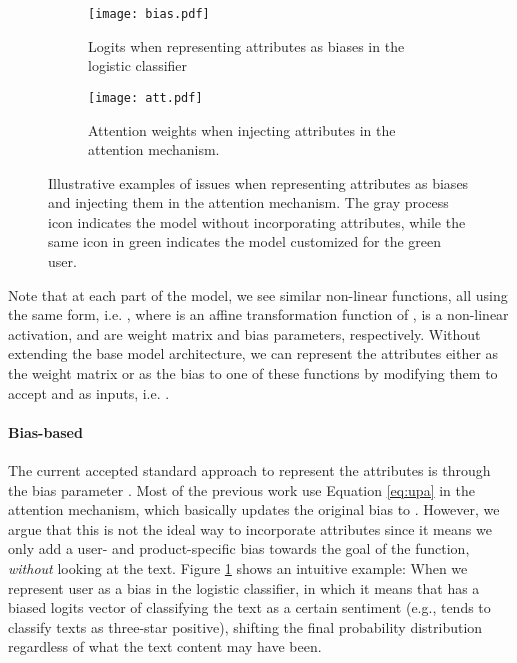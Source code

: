 \documentclass[11pt,a4paper]{article}
\begin{document}
\begin{figure}[t]
    \centering
    \begin{subfigure}{\columnwidth}
        \texttt{[image: bias.pdf]}
        \caption{Logits when representing attributes as biases in the logistic classifier}
        \label{fig:bias}
    \end{subfigure}
    \vspace*{0.2em}
    \begin{subfigure}{\columnwidth}
        \texttt{[image: att.pdf]}
        \caption{Attention weights when injecting attributes in the attention mechanism.}
        \label{fig:att}
    \end{subfigure}
    \caption{Illustrative examples of issues when representing attributes as biases and injecting them in the attention mechanism. The gray process icon indicates the model without incorporating attributes, while the same icon in green indicates the model customized for the green user.}
\end{figure}

Note that at each part of the model, we see similar non-linear functions, all using the same form, i.e. , where  is an affine transformation function of ,  is a non-linear activation,  and  are weight matrix and bias parameters, respectively. Without extending the base model architecture, we can represent the attributes either as the weight matrix  or as the bias  to one of these functions by modifying them to accept  and  as inputs, i.e. .

\paragraph{Bias-based}

The current accepted standard approach to represent the attributes is through the bias parameter . Most of the previous work \cite{chen2016neural,zhu2017parallel,amplayo2018cold,wu2018improving} use Equation \ref{eq:upa} in the attention mechanism, which basically updates the original bias  to . However, we argue that this is not the ideal way to incorporate attributes since it means we only add a user- and product-specific bias towards the goal of the function, \textit{without} looking at the text. 
Figure \ref{fig:bias} shows an intuitive example: When we represent user  as a bias in the logistic classifier, in which it means that  has a biased logits vector  of classifying the text as a certain sentiment (e.g.,  tends to classify texts as three-star positive), shifting the final probability distribution regardless of what the text content may have been.
\end{document}
